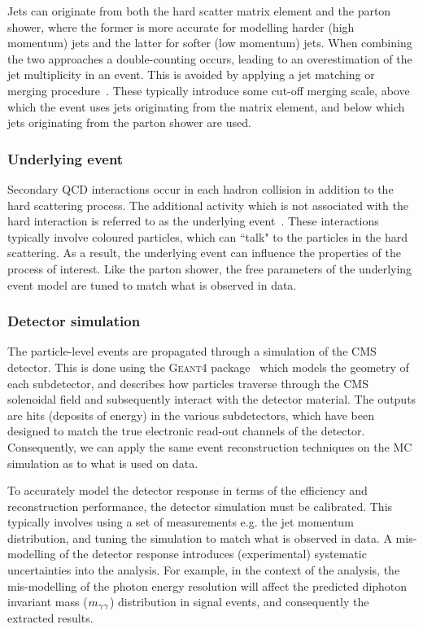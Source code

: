 Jets can originate from both the hard scatter matrix element and the parton shower, where the former is more accurate for modelling harder (high momentum) jets and the latter for softer (low momentum) jets. When combining the two approaches a double-counting occurs, leading to an overestimation of the jet multiplicity in an event. This is avoided by applying a jet matching or merging procedure~\cite{Alwall:2007fs}. These typically introduce some cut-off merging scale, above which the event uses jets originating from the matrix element, and below which jets originating from the parton shower are used.

\subsubsection{Underlying event}
Secondary QCD interactions occur in each hadron collision in addition to the hard scattering process. The additional activity which is not associated with the hard interaction is referred to as the underlying event~\cite{Buckley:2011ms}. These interactions typically involve coloured particles, which can ``talk" to the particles in the hard scattering. As a result, the underlying event can influence the properties of the process of interest. Like the parton shower, the free parameters of the underlying event model are tuned to match what is observed in data. 

\subsubsection{Detector simulation}
The particle-level events are propagated through a simulation of the CMS detector. This is done using the \textsc{Geant4} package~\cite{Agostinelli:2002hh} which models the geometry of each subdetector, and describes how particles traverse through the CMS solenoidal field and subsequently interact with the detector material. The outputs are hits (deposits of energy) in the various subdetectors, which have been designed to match the true electronic read-out channels of the detector. Consequently, we can apply the same event reconstruction techniques on the MC simulation as to what is used on data. 

To accurately model the detector response in terms of the efficiency and reconstruction performance, the detector simulation must be calibrated. This typically involves using a set of measurements e.g. the jet momentum distribution, and tuning the simulation to match what is observed in data. A mis-modelling of the detector response introduces (experimental) systematic uncertainties into the analysis. For example, in the context of the \Hgg analysis, the mis-modelling of the photon energy resolution will affect the predicted diphoton invariant mass ($m_{\gamma\gamma}$) distribution in signal events, and consequently the extracted results. 

